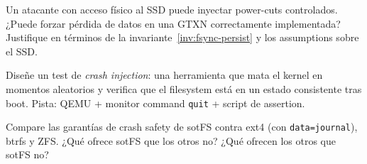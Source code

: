 \begin{ejercicio}[$\star\star$]
Un atacante con acceso físico al SSD puede inyectar power-cuts
controlados. ¿Puede forzar pérdida de datos en una GTXN
correctamente implementada? Justifique en términos de la
invariante~\ref{inv:fsync-persist} y los assumptions sobre el
SSD.
\end{ejercicio}

\begin{ejercicio}[$\star\star\star$]
Diseñe un test de \emph{crash injection}: una herramienta que
mata el kernel en momentos aleatorios y verifica que el
filesystem está en un estado consistente tras boot. Pista:
QEMU + monitor command \texttt{quit} + script de assertion.
\end{ejercicio}

\begin{ejercicio}[$\star\star\star$]
Compare las garantías de crash safety de sotFS contra ext4
(con \texttt{data=journal}), btrfs y ZFS. ¿Qué ofrece sotFS que
los otros no? ¿Qué ofrecen los otros que sotFS no?
\end{ejercicio}

